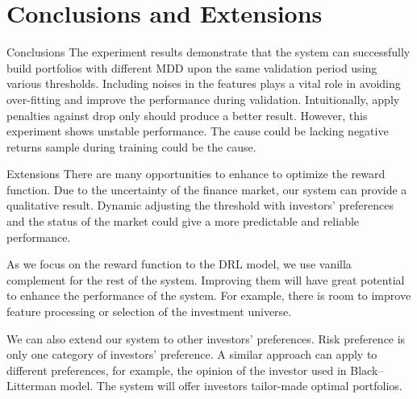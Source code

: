 \section{Conclusions and Extensions}
\begin{frame}{Conclusions}
The experiment results demonstrate that the system can successfully build portfolios with different MDD upon the same validation period using various thresholds. Including noises in the features plays a vital role in avoiding over-fitting and improve the performance during validation. Intuitionally, apply penalties against drop only should produce a better result. However, this experiment shows unstable performance. The cause could be lacking negative returns sample during training could be the cause.
\end{frame}



\begin{frame}{Extensions}
There are many opportunities to enhance to optimize the reward function. Due to the uncertainty of the finance market, our system can provide a qualitative result. Dynamic adjusting the threshold with investors' preferences and the status of the market could give a more predictable and reliable performance.

As we focus on the reward function to the DRL model, we use vanilla complement for the rest of the system. Improving them will have great potential to enhance the performance of the system. For example, there is room to improve feature processing or selection of the investment universe.

\par
We can also extend our system to other investors' preferences. Risk preference is only one category of investors' preference. A similar approach can apply to different preferences, for example, the opinion of the investor used in Black–Litterman model. The system will offer investors tailor-made optimal portfolios.

\end{frame}